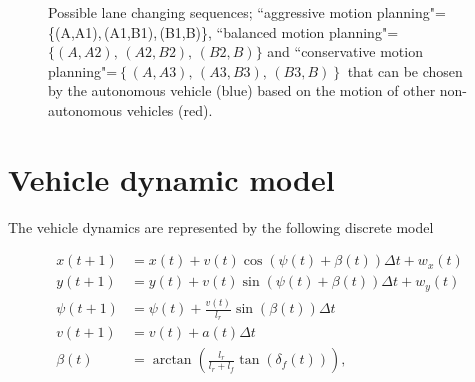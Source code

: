 \documentclass[10pt,journal]{IEEEtran}
\begin{document}
\begin{figure}
\begin{centering}
			\par
		\end{centering}
	\protect\caption{Possible lane changing sequences; ``aggressive motion planning"= \{(A,A1),\,(A1,B1),\,(B1,B)\}, ``balanced motion planning"=$\{\left(A,A2\right),\,\left(A2,B2\right),\,\left(B2,B\right)\}$ and ``conservative motion planning"=$\left\{\left(A,A3\right),\,\left(A3,B3\right),\,\left(B3,B\right)\right\}$ that can be chosen by the autonomous vehicle (blue) based on the motion of other non-autonomous vehicles (red).}
	\label{fig:lane_changing}
	\end{figure}
	
	

	\section{Vehicle dynamic model}
	\label{sec:model}

	The  vehicle dynamics are represented by the following discrete model \cite{Kong2015}

	\begin{subequations}
		\begin{align}
			x\left(t+1\right) & = 	x\left(t\right) + v\left(t\right) \cos\left(\psi \left(t\right) + \beta \left(t\right) \right) \Delta t + w_x\left(t\right)\\ 
			y\left(t+1\right) & = 	y\left(t\right) + v\left(t\right) \sin\left(\psi \left(t\right) + \beta \left(t\right) \right) \Delta t + w_y\left(t\right) \\ 
			\psi\left(t+1\right) & = 	\psi\left(t\right) + \frac{v\left(t\right)}{l_r} \sin\left( \beta \left(t\right) \right) \Delta t \\ 
			v\left(t+1\right) & = 	v\left(t\right) + a\left(t\right)  \Delta t\\
			\beta\left(t\right) & = \arctan\left(\frac{l_r}{l_r+l_f}\tan\left(\delta_f\left(t\right)\right)\right),
		\end{align}
	\label{eq:mod}
	\end{subequations}
\end{document}
